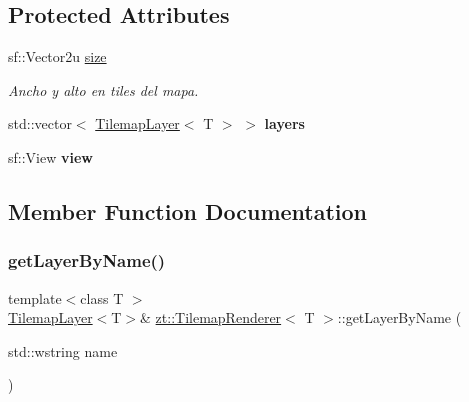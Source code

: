 \subsection*{Protected Attributes}
\begin{DoxyCompactItemize}
\item 
\mbox{\label{classzt_1_1_tilemap_renderer_a41d82c316bae652d144415dcbb7b3fd0}} 
sf\+::\+Vector2u \hyperlink{classzt_1_1_tilemap_renderer_a41d82c316bae652d144415dcbb7b3fd0}{size}
\begin{DoxyCompactList}\small\item\em Ancho y alto en tiles del mapa. \end{DoxyCompactList}\item 
\mbox{\label{classzt_1_1_tilemap_renderer_aa6a529a25e69408699b76bcc25c892fb}} 
std\+::vector$<$ \hyperlink{classzt_1_1_tilemap_layer}{Tilemap\+Layer}$<$ T $>$ $>$ {\bfseries layers}
\item 
\mbox{\label{classzt_1_1_tilemap_renderer_aef57126336a35de96de481267817224d}} 
sf\+::\+View {\bfseries view}
\end{DoxyCompactItemize}


\subsection{Member Function Documentation}
\mbox{\label{classzt_1_1_tilemap_renderer_ad6e938ecae5da3fc70c2e4e36254bf73}} 
\subsubsection{\texorpdfstring{get\+Layer\+By\+Name()}{getLayerByName()}}
{\footnotesize\ttfamily template$<$class T $>$ \\
\hyperlink{classzt_1_1_tilemap_layer}{Tilemap\+Layer}$<$T$>$\& \hyperlink{classzt_1_1_tilemap_renderer}{zt\+::\+Tilemap\+Renderer}$<$ T $>$\+::get\+Layer\+By\+Name (\begin{DoxyParamCaption}\item[{std\+::wstring}]{name }\end{DoxyParamCaption})\hspace{0.3cm}{\ttfamily [inline]}}

